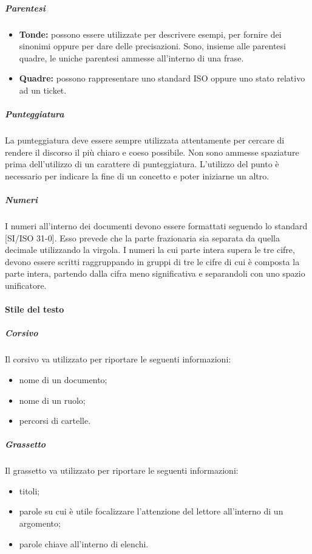 \documentclass[../NormeProgetto.tex]{subfiles}
\begin{document}
			\subparagraph{Parentesi}
				\begin{itemize}
					\item \textbf{Tonde:} possono essere utilizzate per descrivere esempi, per fornire dei sinonimi oppure per dare delle precisazioni. Sono, insieme alle parentesi quadre, le uniche parentesi ammesse all'interno di una frase.
					\item \textbf{Quadre:} possono rappresentare uno standard ISO oppure uno stato relativo ad un ticket\g. 
				\end{itemize}

			
			\subparagraph{Punteggiatura}
				La punteggiatura  deve essere sempre utilizzata attentamente per cercare di rendere il discorso il più chiaro e coeso possibile. Non sono ammesse spaziature prima dell'utilizzo di un carattere di punteggiatura. L'utilizzo del punto è necessario per indicare la fine di un concetto e poter iniziarne un altro.
			
			\subparagraph{Numeri}
				I numeri all'interno dei documenti devono essere formattati seguendo lo standard [SI/ISO 31-0]. Esso prevede che la parte frazionaria sia separata da quella decimale utilizzando la virgola. I numeri la cui parte intera supera le tre cifre, devono essere scritti raggruppando in gruppi di tre le cifre di cui è composta la parte intera, partendo dalla cifra meno significativa e separandoli con uno spazio unificatore.
			
		\paragraph{Stile del testo}

			\subparagraph{Corsivo}
				Il corsivo va utilizzato per riportare le seguenti informazioni:
				\begin{itemize}
					\item nome di un documento;
					\item nome di un ruolo;
					\item percorsi di cartelle.
				\end{itemize}						
			
			\subparagraph{Grassetto}
				Il grassetto va utilizzato per riportare le seguenti informazioni:
				\begin{itemize}
					\item titoli;
					\item parole su cui è utile focalizzare l'attenzione del lettore all'interno di un argomento;
					\item parole chiave all'interno di elenchi.
				\end{itemize}						
			
\end{document}

